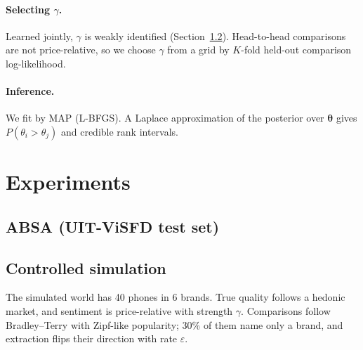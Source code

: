 \documentclass{article}
\begin{document}
\paragraph{Selecting $\gamma$.} Learned jointly, $\gamma$ is weakly identified (Section~\ref{sec:synthetic}).
Head-to-head comparisons are not price-relative, so we choose $\gamma$ from a grid by $K$-fold held-out comparison log-likelihood.
\paragraph{Inference.} We fit by MAP (L-BFGS). A Laplace approximation of the posterior over $\boldsymbol\theta$ gives $P(\theta_i>\theta_j)$ and credible rank intervals.

\section{Experiments}
\subsection{ABSA (UIT-ViSFD test set)}
\begin{center}\small
\setlength{\tabcolsep}{5pt}\end{center}

\subsection{Controlled simulation}\label{sec:synthetic}
The simulated world has 40 phones in 6 brands. True quality follows a hedonic market, and sentiment is price-relative with strength $\gamma$.
Comparisons follow Bradley--Terry with Zipf-like popularity; 30\% of them name only a brand, and extraction flips their direction with rate $\varepsilon$.
\begin{table}[h]\centering\footnotesize\setlength{\tabcolsep}{5pt}
\caption{Spearman $\rho$ against true quality, mean over 20 seeds ($\varepsilon=0.1$, 300 comparisons per aspect). Columns: true price-relativity $\gamma$.}\label{tab:e1}
\end{table}
\end{document}

